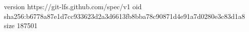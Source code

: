 version https://git-lfs.github.com/spec/v1
oid sha256:b6778a87e1d7cc933623d2a3d6613fb8bba78c90871d4e91a7d0280e3c83d1a8
size 187501
